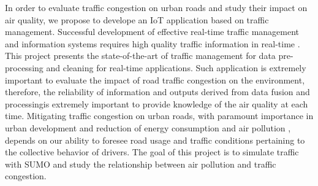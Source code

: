 

In order to evaluate traffic congestion on urban roads and study their impact on air quality, we propose to develope an IoT application based on traffic management.
Successful development of effective real-time traffic management and information systems requires high quality traffic information in real-time \cite{lopes_traffic_2010}.
This project presents the state-of-the-art of traffic management for data pre-processing and cleaning for real-time applications.
Such application is extremely important to evaluate the impact of road traffic congestion on the environment,
	therefore,
	the reliability of information and outputs derived from data fusion and processingis extremely important to provide knowledge of the air quality at each time.
Mitigating traffic congestion on urban roads,
	with paramount importance in urban development and reduction of energy consumption and air pollution \cite{wang_predictability_2015},
	depends on our ability to foresee road usage and traffic conditions pertaining to the collective behavior of drivers.
The goal of this project is to simulate traffic with SUMO \cite{behrisch_sumo_2011} and study the relationship between air pollution and traffic congestion.


\printbibliography
